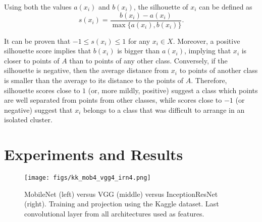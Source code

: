 \documentclass[sn-basic]{sn-jnl}%
\theoremstyle{thmstyleone}%
\theoremstyle{thmstyletwo}%
\theoremstyle{thmstylethree}%
\begin{document}
Using both the values $a(x_i)$ and $b(x_i)$, the silhouette of $x_i$ can be defined as
\begin{equation}
\label{eq:silhouette}
s(x_i) = \frac{b(x_i) - a(x_i)}{\max\{a(x_i), b(x_i)\}}.
\end{equation}

It can be proven that $-1 \leq s(x_i) \leq 1$ for any $x_i \in X$. Moreover, a positive silhouette score implies that $b(x_i)$ is bigger than $a(x_i)$, implying that $x_i$ is closer to points of $A$ than to points of any other class. Conversely, if the silhouette is negative, then the average distance from $x_i$ to points of another class is smaller than the average to its distance to the points of $A$. Therefore, silhouette scores close to $1$ (or, more mildly, positive) suggest a class which points are well separated from points from other classes, while scores close to $-1$ (or negative) suggest that $x_i$ belongs to a class that was difficult to arrange in an isolated cluster.



\section{Experiments and Results}



\begin{figure*}[htb]
\centerline{\texttt{[image: figs/kk\_mob4\_vgg4\_irn4.png]}}
\caption{MobileNet (left) versus VGG (middle) versus InceptionResNet (right). Training and projection using the Kaggle dataset. Last convolutional layer from all architectures used as features.}
\label{fig:kk_mob4_vgg4_irn4}
\end{figure*}
\end{document}
